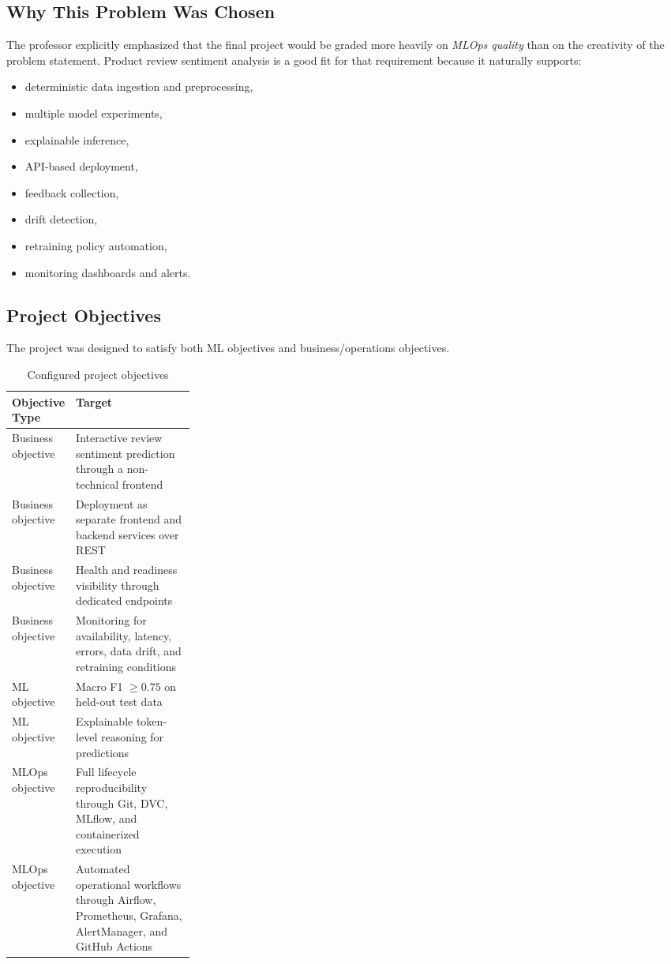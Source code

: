 \documentclass[11pt,a4paper]{article}
\begin{document}
\subsection{Why This Problem Was Chosen}

The professor explicitly emphasized that the final project would be graded more heavily on \emph{MLOps quality} than on the creativity of the problem statement. Product review sentiment analysis is a good fit for that requirement because it naturally supports:

\begin{itemize}[leftmargin=1.4em]
  \item deterministic data ingestion and preprocessing,
  \item multiple model experiments,
  \item explainable inference,
  \item API-based deployment,
  \item feedback collection,
  \item drift detection,
  \item retraining policy automation,
  \item monitoring dashboards and alerts.
\end{itemize}

\subsection{Project Objectives}

The project was designed to satisfy both ML objectives and business/operations objectives.

\begin{table}[H]
  \centering
  \caption{Configured project objectives}
  \begin{tabularx}{\linewidth}{>{\raggedright\arraybackslash}p{0.27\linewidth}X}
    \toprule
    \textbf{Objective Type} & \textbf{Target} \\
    \midrule
    Business objective & Interactive review sentiment prediction through a non-technical frontend \\
    Business objective & Deployment as separate frontend and backend services over REST \\
    Business objective & Health and readiness visibility through dedicated endpoints \\
    Business objective & Monitoring for availability, latency, errors, data drift, and retraining conditions \\
    ML objective & Macro F1 $\ge 0.75$ on held-out test data \\
    ML objective & Explainable token-level reasoning for predictions \\
    MLOps objective & Full lifecycle reproducibility through Git, DVC, MLflow, and containerized execution \\
    MLOps objective & Automated operational workflows through Airflow, Prometheus, Grafana, AlertManager, and GitHub Actions \\
    \bottomrule
  \end{tabularx}
\end{table}
\end{document}
